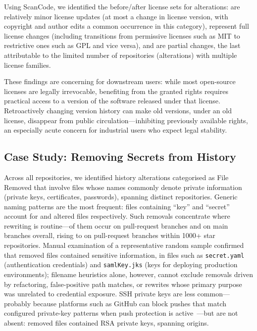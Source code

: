 Using ScanCode, we identified the before/after license sets for \LicenseModifiedBothScanned alterations: \LicenseUpdate are relatively minor license updates (at most a change in license version, with copyright and author edits a common occurrence in this category), \LicenseFullChange represent full license changes (including transitions from permissive licenses such as MIT to restrictive ones such as GPL and vice versa), and \LicensePartialChange are partial changes, the last attributable to the limited number of repositories (\LicenseSeveralFamilies alterations) with multiple license families.

These findings are concerning for downstream users: while most open-source licenses are legally irrevocable, benefiting from the granted rights requires practical access to a version of the software released under that license.
Retroactively changing version history can make old versions, under an old license, disappear from public circulation---inhibiting previously available rights, an especially acute concern for industrial users who expect legal stability.

\subsection{Case Study: Removing Secrets from History}
\label{subsec:hist-sec-secrets}

Across all repositories, we identified \SecretsRemovedAllShort history alterations categorised as File Removed that involve files whose names commonly denote private information (private keys, certificates, passwords), spanning \SecretsOriginsAllShort distinct repositories.
Generic naming patterns are the most frequent: files containing ``key'' and ``secret'' account for \SecretsRemovedAllKeyShort and \SecretsRemovedAllSecretShort altered files respectively.
Such removals concentrate where rewriting is routine---\PercentSecretsPullBranch of them occur on pull-request branches and \PercentSecretsMainBranch on main branches overall, rising to \PercentSecretsThousandStarsPullBranch on pull-request branches within 1000+ star repositories.
Manual examination of a representative random sample confirmed that removed files contained sensitive information, in files such as \texttt{secret.yaml} (authentication credentials) and \texttt{samlKey.jks} (keys for deploying production environments); filename heuristics alone, however, cannot exclude removals driven by refactoring, false-positive path matches, or rewrites whose primary purpose was unrelated to credential exposure.
SSH private keys are less common---probably because platforms such as GitHub can block pushes that match configured private-key patterns when push protection is active~\cite{github_push_protection}---but are not absent: \SecretsRemovedIdRsa removed files contained RSA private keys, spanning \SecretsRemovedIdRsaOrigins origins.

